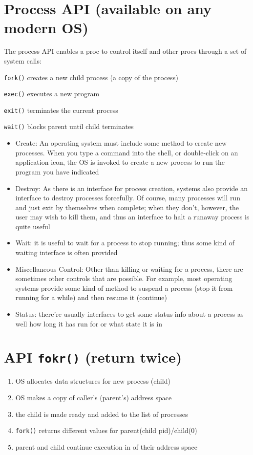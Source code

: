 \section*{Process API (available on any modern OS)}
The process API enables a proc to control itself and other procs through a set of system calls:
  \begin{enumerate*}[label={\alph*.},font={\color{red!50!black}\bfseries}]
  \item \texttt{fork()} creates a new child process (a copy of the process)
  \item \texttt{exec()} executes a new program
  \item \texttt{exit()} terminates the current process
  \item \texttt{wait()} blocks parent until child terminates
  \end{enumerate*}
\begin{itemize}
\item Create: An operating system must include some method to create new processes. When you type a command into the shell, or double-click on an application icon, the OS is invoked to create a new process to run the program you have indicated
\item Destroy: As there is an interface for process creation, systems also provide an interface to destroy processes forcefully. Of course, many processes will run and just exit by themselves when complete; when they don’t, however, the user may wish to kill them, and thus an interface to halt a runaway process is quite useful
\item Wait: it is useful to wait for a process to stop running; thus some kind of waiting interface is often provided
\item Miscellaneous Control: Other than killing or waiting for a process, there are sometimes other controls that are possible. For example, most operating systems provide some kind of method to suspend a process (stop it from running for a while) and then resume it (continue)
\item Status: there're usually interfaces to get some status info about a process as well how long it has run for or what state it is in
\end{itemize}
\section*{API \texttt{fokr()} (return twice)}
\begin{enumerate}
\item OS allocates data structures for new process (child)
\item OS makes a copy of caller's (parent's) address space
\item the child is made ready and added to the list of processes
\item \texttt{fork()} returns different values for parent(child pid)/child(0)
\item parent and child continue execution in  of their address space
\end{enumerate}
